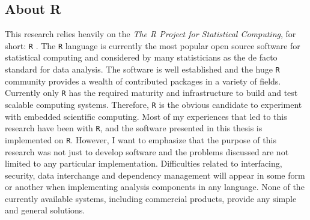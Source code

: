 

\subsection{About R}

This research relies heavily on the \emph{The R Project for Statistical Computing}, for short: \texttt{R} \citep{R}. The \texttt{R} language is currently the most popular open source software for statistical computing and considered by many statisticians as the de facto standard for data analysis. The software is well established and the huge \texttt{R} community provides a wealth of contributed packages in a variety of fields. Currently only \texttt{R} has the required maturity and infrastructure to build and test scalable computing systems. Therefore, \texttt{R} is the obvious candidate to experiment with embedded scientific computing. Most of my experiences that led to this research have been with \texttt{R}, and the software presented in this thesis is implemented on \texttt{R}. However, I want to emphasize that the purpose of this research was not just to develop software and the problems discussed are not limited to any particular implementation. Difficulties related to interfacing, security, data interchange and dependency management will appear in some form or another when implementing analysis components in any language. None of the currently available systems, including commercial products, provide any simple and general solutions.

